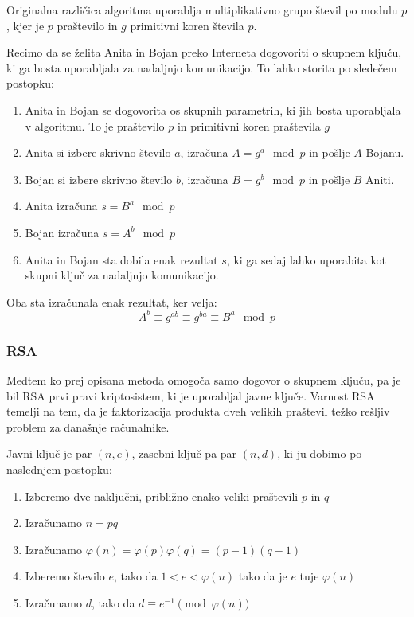 \documentclass[12pt,a4paper,openany]{book}
\begin{document}
Originalna različica algoritma uporablja multiplikativno grupo števil po modulu $p$, kjer je $p$ praštevilo in $g$ primitivni koren števila $p$.

Recimo da se želita Anita in Bojan preko Interneta dogovoriti o skupnem ključu, ki ga bosta uporabljala za nadaljnjo komunikacijo. To lahko storita po sledečem postopku:

\begin{mdframed}[frametitle={Izmenjava ključa Diffe-Hellman}]
\begin{enumerate}
	\item Anita in Bojan se dogovorita os skupnih parametrih, ki jih bosta uporabljala v algoritmu. To je praštevilo $p$ in primitivni koren praštevila $g$
	\item Anita si izbere skrivno število $a$, izračuna $A=g^a \mod p$ in pošlje $A$ Bojanu.
	\item Bojan si izbere skrivno število $b$, izračuna $B=g^b \mod p$ in pošlje $B$ Aniti.
	\item Anita izračuna $s=B^a \mod p$
	\item Bojan izračuna $s=A^b \mod p$
	\item Anita in Bojan sta dobila enak rezultat $s$, ki ga sedaj lahko uporabita kot skupni ključ za nadaljnjo komunikacijo.
\end{enumerate}

\vspace{0.5cm}

Oba sta izračunala enak rezultat, ker velja:
$$
A^b \equiv g^{ab} \equiv g^{ba} \equiv B^a \mod p
$$

\end{mdframed}



\subsubsection{RSA}

Medtem ko prej opisana metoda omogoča samo dogovor o skupnem ključu, pa je bil RSA prvi pravi kriptosistem, ki je uporabljal javne ključe. Varnost RSA temelji na tem, da je faktorizacija produkta dveh velikih praštevil težko rešljiv problem za današnje računalnike.

Javni ključ je par $(n, e)$, zasebni ključ pa par $(n, d)$, ki ju dobimo po naslednjem postopku:

\begin{enumerate}
\item Izberemo dve naključni, približno enako veliki praštevili $p$ in $q$
\item Izračunamo $n=pq$
\item Izračunamo $\varphi(n)=\varphi(p)\varphi(q)=(p-1)(q-1)$
\item Izberemo število $e$, tako da $1<e<\varphi(n)$ tako da je $e$ tuje $\varphi(n)$
\item Izračunamo $d$, tako da $d \equiv e^{-1} \pmod{\varphi(n)}$
\end{enumerate}
\end{document}
